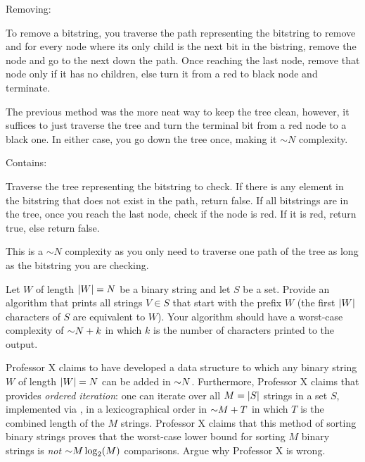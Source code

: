 \begin{problem}
\begin{questions}

Removing:

To remove a bitstring, you traverse the path representing the bitstring to remove and for every node where its only child is the next bit in the bistring, remove the node and go to the next down the path. Once reaching the last node, remove that node only if it has no children, else turn it from a red to black node and terminate.

The previous method was the more neat way to keep the tree clean, however, it suffices to just traverse the tree and turn the terminal bit from a red node to a black one. In either case, you go down the tree once, making it $\sim N$ complexity.

Contains:

Traverse the tree representing the bitstring to check. If there is any element in the bitstring that does not exist in the path, return false. If all bitstrings are in the tree, once you reach the last node, check if the node is red. If it is red, return true, else return false.

This is a $\sim N$ complexity as you only need to traverse one path of the tree as long as the bitstring you are checking. 

\item Let $W$ of length $\lvert W \rvert = N$ be a binary string and let $S$ be a  set. Provide an algorithm that prints all strings $V \in S$ that start with the prefix $W$ (the first $\lvert W \rvert$ characters of $S$ are equivalent to $W$). Your algorithm should have a worst-case complexity of $\mathord{\sim}N + k$ in which $k$ is the number of characters printed to the output.



\item Professor X claims to have developed a data structure  to which any binary string $W$ of length $\lvert W \rvert = N$ can be added in $\mathord{\sim}N$. Furthermore, Professor X claims that   provides \emph{ordered iteration}: one can iterate over all $M = \lvert S \rvert$ strings in a set $S$, implemented via , in a lexicographical order in $\mathord{\sim}M + T$ in which $T$ is the combined length of the $M$ strings. Professor X claims that this method of sorting binary strings proves that the worst-case lower bound for sorting $M$ binary strings is \emph{not} $\mathord{\sim}M \log_2(M)$ comparisons. Argue why Professor X is wrong.


\end{questions}
\end{problem}
